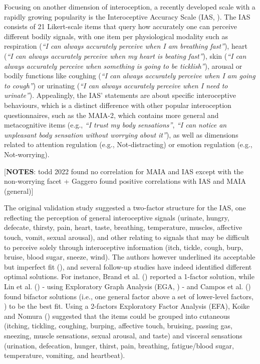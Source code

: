 \documentclass[
  jou,
  floatsintext,
  longtable,
  nolmodern,
  notxfonts,
  notimes,
  colorlinks=true,linkcolor=blue,citecolor=blue,urlcolor=blue]{apa7}
\begin{document}
Focusing on another dimension of interoception, a recently developed
scale with a rapidly growing popularity is the Interoceptive Accuracy
Scale (IAS, ). The IAS
consists of 21 Likert-scale items that query how accurately one can
perceive different bodily signals, with one item per physiological
modality such as respiration (\emph{``I can always accurately perceive
when I am breathing fast''}), heart (\emph{``I can always accurately
perceive when my heart is beating fast''}), skin (\emph{``I can always
accurately perceive when something is going to be ticklish''}), arousal
or bodily functions like coughing (\emph{``I can always accurately
perceive when I am going to cough''}) or urinating (\emph{``I can always
accurately perceive when I need to urinate''}). Appealingly, the IAS'
statements are about specific interoceptive behaviours, which is a
distinct difference with other popular interoception questionnaires,
such as the MAIA-2, which contains more general and metacognitive items
(e.g., \emph{``I trust my body sensations''}, \emph{``I can notice an
unpleasant body sensation without worrying about it''}), as well as
dimensions related to attention regulation (e.g., Not-distracting) or
emotion regulation (e.g., Not-worrying).

{[}\textbf{NOTES}: todd 2022 found no correlation for MAIA and IAS
except with the non-worrying facet + Gaggero found positive correlations
with IAS and MAIA (general){]}

The original validation study suggested a two-factor structure for the
IAS, one reflecting the perception of general interoceptive signals
(urinate, hungry, defecate, thirsty, pain, heart, taste, breathing,
temperature, muscles, affective touch, vomit, sexual arousal), and other
relating to signals that may be difficult to perceive solely through
interoceptive information (itch, tickle, cough, burp, bruise, blood
sugar, sneeze, wind). The authors however underlined its acceptable but
imperfect fit (),
and several follow-up studies have indeed identified different optimal
solutions. For instance, Brand et al. ()
reported a 1-factor solution, while Lin et al.
() - using Exploratory Graph Analysis (EGA,
) -
and Campos et al. () found bifactor
solutions (i.e., one general factor above a set of lower-level factors,
) to be
the best fit. Using a 2-factors Exploratory Factor Analysis (EFA), Koike
and Nomura () suggested that the items
could be grouped into cutaneous (itching, tickling, coughing, burping,
affective touch, bruising, passing gas, sneezing, muscle sensations,
sexual arousal, and taste) and visceral sensations (urination,
defecation, hunger, thirst, pain, breathing, fatigue/blood sugar,
temperature, vomiting, and heartbeat).
\end{document}
